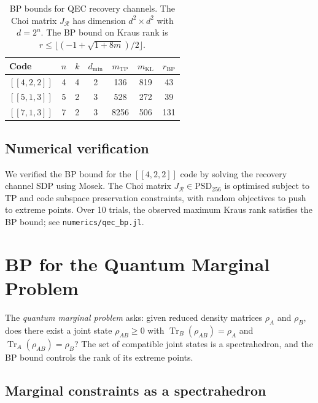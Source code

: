 \documentclass[11pt,a4paper]{article}
\theoremstyle{definition}
\newcommand{\PSD}{\mathrm{PSD}}
\newcommand{\Tr}{\operatorname{Tr}}
\begin{document}
\begin{table}[htbp]
\centering
\caption{BP bounds for QEC recovery channels.  The Choi matrix
$J_\mathcal{R}$ has dimension $d^2 \times d^2$ with $d = 2^n$.
The BP bound on Kraus rank is $r \leq \lfloor(-1 + \sqrt{1 + 8m})/2\rfloor$.}
\label{tab:qec-bp}
\begin{tabular}{lcccccc}
\toprule
\textbf{Code} & $n$ & $k$ & $d_{\min}$ & $m_{\mathrm{TP}}$ & $m_{\mathrm{KL}}$
  & $r_{\mathrm{BP}}$ \\
\midrule
$[[4,2,2]]$ & 4 & 4 & 2 & 136  & 819  & 43 \\
$[[5,1,3]]$ & 5 & 2 & 3 & 528  & 272  & 39 \\
$[[7,1,3]]$ & 7 & 2 & 3 & 8256 & 506  & 131 \\
\bottomrule
\end{tabular}
\end{table}

\subsection{Numerical verification}

We verified the BP bound for the $[[4,2,2]]$ code by solving the
recovery channel SDP using Mosek.  The Choi matrix
$J_\mathcal{R} \in \PSD_{256}$ is optimised subject to TP and code
subspace preservation constraints, with random objectives to push
to extreme points.  Over 10 trials, the observed maximum Kraus rank
satisfies the BP bound; see \texttt{numerics/qec\_bp.jl}.

\section{BP for the Quantum Marginal Problem}
\label{sec:marginals}

The \emph{quantum marginal problem} asks: given reduced density
matrices $\rho_A$ and $\rho_B$, does there exist a joint state
$\rho_{AB} \geq 0$ with $\Tr_B(\rho_{AB}) = \rho_A$ and
$\Tr_A(\rho_{AB}) = \rho_B$?  The set of compatible joint states
is a spectrahedron, and the BP bound controls the rank of its
extreme points.

\subsection{Marginal constraints as a spectrahedron}
\end{document}
